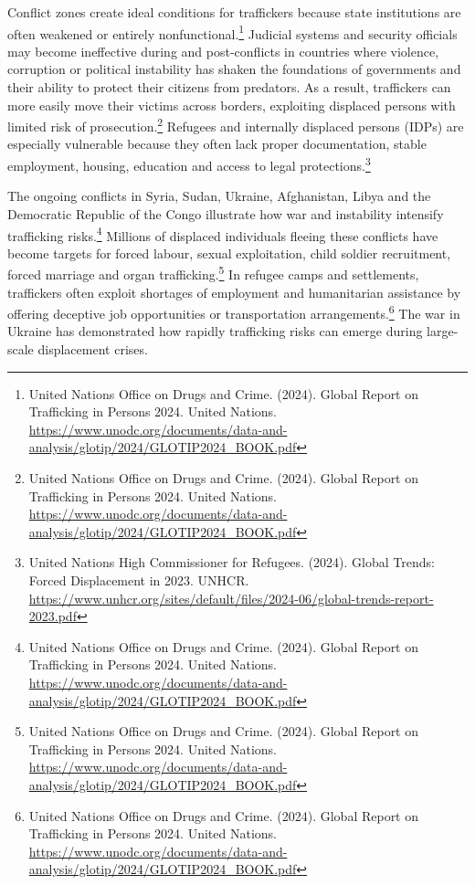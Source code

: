 Conflict zones create ideal conditions for traffickers because state institutions are often weakened or entirely nonfunctional.\footnote{United Nations Office on Drugs and Crime. (2024). Global Report on Trafficking in Persons 2024. United Nations. \url{https://www.unodc.org/documents/data-and-analysis/glotip/2024/GLOTIP2024_BOOK.pdf}} Judicial systems and security officials may become ineffective during and post-conflicts in countries where violence, corruption or political instability has shaken the foundations of governments and their ability to protect their citizens from predators. As a result, traffickers can more easily move their victims across borders, exploiting displaced persons with limited risk of prosecution.\footnote{United Nations Office on Drugs and Crime. (2024). Global Report on Trafficking in Persons 2024. United Nations. \url{https://www.unodc.org/documents/data-and-analysis/glotip/2024/GLOTIP2024_BOOK.pdf}} Refugees and internally displaced persons (IDPs) are especially vulnerable because they often lack proper documentation, stable employment, housing, education and access to legal protections.\footnote{United Nations High Commissioner for Refugees. (2024). Global Trends: Forced Displacement in 2023. UNHCR. \url{https://www.unhcr.org/sites/default/files/2024-06/global-trends-report-2023.pdf}}

The ongoing conflicts in Syria, Sudan, Ukraine, Afghanistan, Libya and the Democratic Republic of the Congo illustrate how war and instability intensify trafficking risks.\footnote{United Nations Office on Drugs and Crime. (2024). Global Report on Trafficking in Persons 2024. United Nations. \url{https://www.unodc.org/documents/data-and-analysis/glotip/2024/GLOTIP2024_BOOK.pdf}} Millions of displaced individuals fleeing these conflicts have become targets for forced labour, sexual exploitation, child soldier recruitment, forced marriage and organ trafficking.\footnote{United Nations Office on Drugs and Crime. (2024). Global Report on Trafficking in Persons 2024. United Nations. \url{https://www.unodc.org/documents/data-and-analysis/glotip/2024/GLOTIP2024_BOOK.pdf}} In refugee camps and settlements, traffickers often exploit shortages of employment and humanitarian assistance by offering deceptive job opportunities or transportation arrangements.\footnote{United Nations Office on Drugs and Crime. (2024). Global Report on Trafficking in Persons 2024. United Nations. \url{https://www.unodc.org/documents/data-and-analysis/glotip/2024/GLOTIP2024_BOOK.pdf}} The war in Ukraine has demonstrated how rapidly trafficking risks can emerge during large-scale displacement crises.

